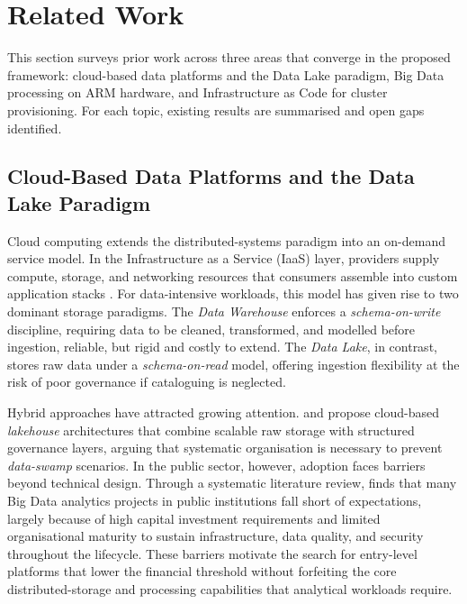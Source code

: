 \section{Related Work}
\label{sec:literature}

This section surveys prior work across three areas that converge in the proposed
framework: cloud-based data platforms and the Data Lake paradigm, Big Data processing
on ARM hardware, and Infrastructure as Code for cluster provisioning. For each topic,
existing results are summarised and open gaps identified.

\subsection{Cloud-Based Data Platforms and the Data Lake Paradigm}

Cloud computing extends the distributed-systems paradigm into an on-demand service
model. In the Infrastructure as a Service (IaaS) layer, providers supply compute,
storage, and networking resources that consumers assemble into custom application
stacks \citep{tanenbaum2017distributed}. For data-intensive workloads, this model has
given rise to two dominant storage paradigms. The \emph{Data Warehouse} enforces a
\emph{schema-on-write} discipline, requiring data to be cleaned, transformed, and
modelled before ingestion, reliable, but rigid and costly to extend. The
\emph{Data Lake}, in contrast, stores raw data under a \emph{schema-on-read} model,
offering ingestion flexibility at the risk of poor governance if cataloguing is
neglected.

Hybrid approaches have attracted growing attention. \citet{nuthalapati2024architecting} and
\citet{sundar2022comprehensive}
propose cloud-based \emph{lakehouse} architectures that combine scalable raw storage
with structured governance layers, arguing that systematic organisation is necessary
to prevent \emph{data-swamp} scenarios. In the public sector, however, adoption faces
barriers beyond technical design. Through a systematic literature review, \citet{didas}
finds that many Big Data analytics projects in public institutions fall
short of expectations, largely because of high capital investment requirements and
limited organisational maturity to sustain infrastructure, data quality, and security
throughout the lifecycle. These barriers motivate the search for entry-level platforms
that lower the financial threshold without forfeiting the core distributed-storage and
processing capabilities that analytical workloads require.

